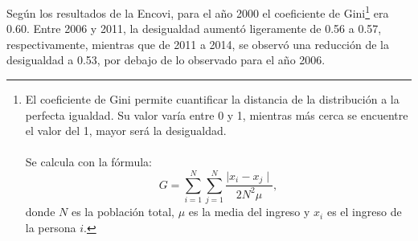 Según los resultados de la Encovi, para el año 2000 el coeficiente de Gini\footnote{El coeficiente de Gini permite cuantificar la distancia de la distribución a la perfecta igualdad. Su valor varía entre 0 y 1, mientras más cerca se encuentre el valor del 1, mayor será la desigualdad. \\\\ 
	Se calcula con la fórmula: 
	\[ G= \sum_{i=1}^{N}\sum_{j=1}^{N}\frac{\mid x_i - x_j \mid}{2N^2\mu}, \] donde $N$ es la población total, $\mu$ es la media del ingreso y $x_i$ es el ingreso de la persona $i$. } era 0.60. Entre 2006 y 2011, la desigualdad aumentó ligeramente de 0.56 a 0.57, respectivamente, mientras que de 2011 a 2014, se observó una reducción de la desigualdad a 0.53, por debajo de lo observado para el año 2006.